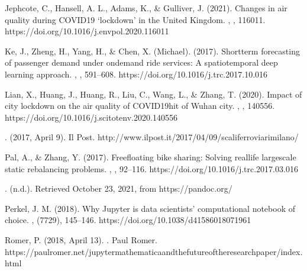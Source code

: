 \documentclass[letterpaper,10pt,english]{jupyterBook}
\begin{document}
\sphinxAtStartPar
Jephcote, C., Hansell, A. L., Adams, K., \& Gulliver, J. (2021). Changes in air quality during COVID\sphinxhyphen{}19 ‘lockdown’ in the United Kingdom. , , 116011. https://doi.org/10.1016/j.envpol.2020.116011

\sphinxAtStartPar
Ke, J., Zheng, H., Yang, H., \& Chen, X. (Michael). (2017). Short\sphinxhyphen{}term forecasting of passenger demand under on\sphinxhyphen{}demand ride services: A spatio\sphinxhyphen{}temporal deep learning approach. , , 591–608. https://doi.org/10.1016/j.trc.2017.10.016

\sphinxAtStartPar
Lian, X., Huang, J., Huang, R., Liu, C., Wang, L., \& Zhang, T. (2020). Impact of city lockdown on the air quality of COVID\sphinxhyphen{}19\sphinxhyphen{}hit of Wuhan city. , , 140556. https://doi.org/10.1016/j.scitotenv.2020.140556

\sphinxAtStartPar
{}. (2017, April 9). Il Post. http://www.ilpost.it/2017/04/09/scali\sphinxhyphen{}ferroviari\sphinxhyphen{}milano/

\sphinxAtStartPar
Pal, A., \& Zhang, Y. (2017). Free\sphinxhyphen{}floating bike sharing: Solving real\sphinxhyphen{}life large\sphinxhyphen{}scale static rebalancing problems. , , 92–116. https://doi.org/10.1016/j.trc.2017.03.016

\sphinxAtStartPar
{}. (n.d.). Retrieved October 23, 2021, from https://pandoc.org/

\sphinxAtStartPar
Perkel, J. M. (2018). Why Jupyter is data scientists’ computational notebook of choice. , (7729), 145–146. https://doi.org/10.1038/d41586\sphinxhyphen{}018\sphinxhyphen{}07196\sphinxhyphen{}1

\sphinxAtStartPar
Romer, P. (2018, April 13). . Paul Romer. https://paulromer.net/jupyter\sphinxhyphen{}mathematica\sphinxhyphen{}and\sphinxhyphen{}the\sphinxhyphen{}future\sphinxhyphen{}of\sphinxhyphen{}the\sphinxhyphen{}research\sphinxhyphen{}paper/index.html
\end{document}
